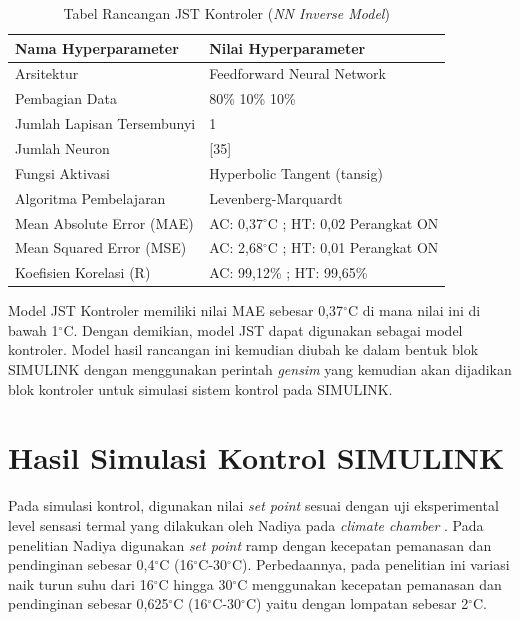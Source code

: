\begin{table}[!h]
	\caption{Tabel Rancangan JST Kontroler (\textit{NN Inverse Model})}
	\label{tbl:5:NNControl}
	\centering
	\begin{tabular}{|p{5.7cm}|p{6.5cm}|}
		\hline
		\textbf{Nama Hyperparameter} & \textbf{Nilai Hyperparameter} \\ \hline
		Arsitektur & Feedforward Neural Network \\ \hline
		Pembagian Data & 80\% 10\% 10\% \\ \hline 
		Jumlah Lapisan Tersembunyi & 1 \\ \hline
		Jumlah Neuron & [35] \\ \hline
		Fungsi Aktivasi & Hyperbolic Tangent (tansig) \\ \hline
		Algoritma Pembelajaran & Levenberg-Marquardt \\ \hline
		Mean Absolute Error (MAE) & AC: 0,37$^\circ$C ; HT: 0,02 Perangkat ON\\ \hline
		Mean Squared Error (MSE) & AC: 2,68$^\circ$C ; HT: 0,01 Perangkat ON\\ \hline
		Koefisien Korelasi (R) & AC: 99,12\% ; HT: 99,65\% \\ \hline
	\end{tabular}
\end{table}

Model JST Kontroler memiliki nilai MAE sebesar 0,37$^\circ$C di mana nilai ini di bawah 1$^\circ$C. Dengan demikian, model JST dapat digunakan sebagai model kontroler. Model hasil rancangan ini kemudian diubah ke dalam bentuk blok SIMULINK dengan menggunakan perintah \textit{gensim} yang kemudian akan dijadikan blok kontroler untuk simulasi sistem kontrol pada SIMULINK.

\section{Hasil Simulasi Kontrol SIMULINK}

Pada simulasi kontrol, digunakan nilai \textit{set point} sesuai dengan uji eksperimental level sensasi termal yang dilakukan oleh Nadiya pada \textit{climate chamber} \cite{skripsiMuna}. Pada penelitian Nadiya digunakan \textit{set point} ramp dengan kecepatan pemanasan dan pendinginan sebesar 0,4$^{\circ}$C (16$^{\circ}$C-30$^{\circ}$C). Perbedaannya, pada penelitian ini variasi naik turun suhu dari 16$^\circ$C hingga 30$^\circ$C menggunakan kecepatan pemanasan dan pendinginan sebesar 0,625$^{\circ}$C (16$^{\circ}$C-30$^{\circ}$C) yaitu dengan lompatan sebesar 2$^\circ$C.

